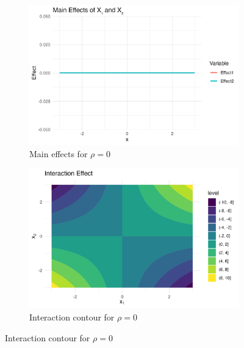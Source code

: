 \begin{figure}[htpb]
    \vspace{0.5em}
    \begin{subfigure}[t]{0.49\textwidth}
        \centering
        \includegraphics[width=\textwidth]{images/interaction_a1p00_a2p00_a11p00_a22p00_a12p10_rhop00_main.png}
        \caption{Main effects for $\rho = 0$}
    \end{subfigure}%
    \hfill
    \begin{subfigure}[t]{0.49\textwidth}
        \centering
        \includegraphics[width=\textwidth]{images/interaction_a1p00_a2p00_a11p00_a22p00_a12p10_rhop00_interaction.png}
        \caption{Interaction contour for $\rho = 0$}
    \end{subfigure}


\end{figure}

